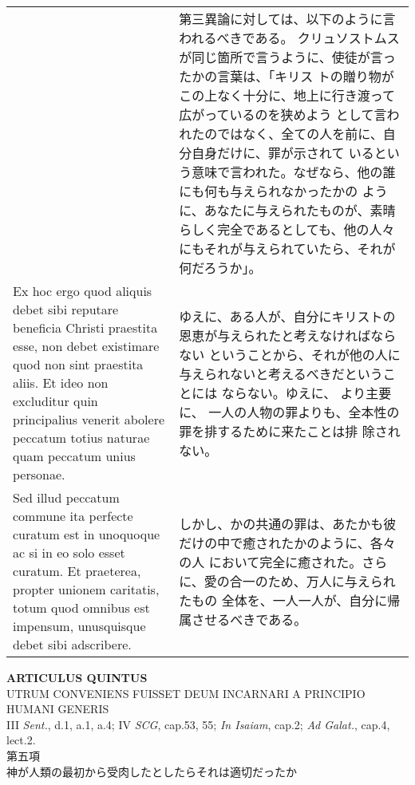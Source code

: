 \documentclass[10pt]{jsarticle} %
\begin{document}
\begin{longtable}{p{21em}p{21em}}
&

第三異論に対しては、以下のように言われるべきである。
クリュソストムスが同じ箇所で言うように、使徒が言ったかの言葉は、「キリス
 トの贈り物がこの上なく十分に、地上に行き渡って広がっているのを狭めよう
 として言われたのではなく、全ての人を前に、自分自身だけに、罪が示されて
 いるという意味で言われた。なぜなら、他の誰にも何も与えられなかったかの
 ように、あなたに与えられたものが、素晴らしく完全であるとしても、他の人々
 にもそれが与えられていたら、それが何だろうか」。

\\

Ex hoc ergo
quod aliquis debet sibi reputare beneficia Christi praestita esse, non
debet existimare quod non sint praestita aliis. 
Et ideo non excluditur
quin principalius venerit abolere peccatum totius naturae quam peccatum
unius personae.


&

ゆえに、ある人が、自分にキリストの恩恵が与えられたと考えなければならない
 ということから、それが他の人に与えられないと考えるべきだということには
 ならない。ゆえに、
より主要に、 一人の人物の罪よりも、全本性の罪を排するために来たことは排
 除されない。


\\

 Sed illud peccatum commune ita perfecte curatum est in
unoquoque ac si in eo solo esset curatum. Et praeterea, propter unionem
caritatis, totum quod omnibus est impensum, unusquisque debet sibi
adscribere.


&

しかし、かの共通の罪は、あたかも彼だけの中で癒されたかのように、各々の人
 において完全に癒された。さらに、愛の合一のため、万人に与えられたもの
 全体を、一人一人が、自分に帰属させるべきである。



\end{longtable}
\newpage


\begin{center}
 {\Large {\bf ARTICULUS QUINTUS}}\\
 {\large UTRUM CONVENIENS FUISSET DEUM INCARNARI A PRINCIPIO HUMANI GENERIS}\\
 {\footnotesize III {\itshape Sent.}, d.1, a.1, a.4; IV {\itshape SCG},
 cap.53, 55; {\itshape In Isaiam}, cap.2; {\itshape Ad Galat.}, cap.4, lect.2.}\\
 {\Large 第五項\\神が人類の最初から受肉したとしたらそれは適切だったか}
\end{center}
\end{document}
